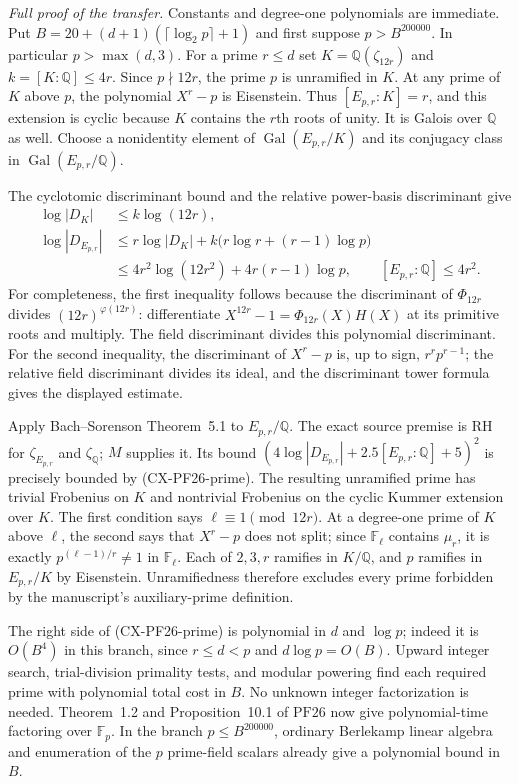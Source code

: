 \emph{Full proof of the transfer.}
Constants and degree-one polynomials are immediate. Put
$B=20+(d+1)(\lceil\log_2p\rceil+1)$ and first suppose
$p>B^{200000}$. In particular $p>\max(d,3)$.
For a prime $r\le d$ set $K=\mathbb Q(\zeta_{12r})$ and
$k=[K:\mathbb Q]\le4r$. Since $p\nmid12r$, the prime $p$ is
unramified in $K$. At any prime of $K$ above $p$, the polynomial
$X^r-p$ is Eisenstein. Thus $[E_{p,r}:K]=r$, and this extension is
cyclic because $K$ contains the $r$th roots of unity. It is Galois
over $\mathbb Q$ as well. Choose a nonidentity element of
$\operatorname{Gal}(E_{p,r}/K)$ and its conjugacy class in
$\operatorname{Gal}(E_{p,r}/\mathbb Q)$.

The cyclotomic discriminant bound and the relative power-basis
discriminant give
\begin{align*}
 \log|D_K|&\le k\log(12r),\\
 \log|D_{E_{p,r}}|
 &\le r\log|D_K|+
        k\bigl(r\log r+(r-1)\log p\bigr)\\
 &\le4r^2\log(12r^2)+4r(r-1)\log p,\qquad
 [E_{p,r}:\mathbb Q]\le4r^2.
\end{align*}
For completeness, the first inequality follows because the
discriminant of $\Phi_{12r}$ divides $(12r)^{\varphi(12r)}$:
differentiate $X^{12r}-1=\Phi_{12r}(X)H(X)$ at its primitive
roots and multiply. The field discriminant divides this polynomial
discriminant. For the second inequality, the discriminant of
$X^r-p$ is, up to sign, $r^rp^{r-1}$; the relative field
discriminant divides its ideal, and the discriminant tower formula
gives the displayed estimate.

Apply Bach--Sorenson Theorem~5.1 to $E_{p,r}/\mathbb Q$.
The exact source premise is RH for $\zeta_{E_{p,r}}$ and
$\zeta_{\mathbb Q}$; $M$ supplies it. Its bound
$(4\log|D_{E_{p,r}}|+2.5[E_{p,r}:\mathbb Q]+5)^2$
is precisely bounded by (CX-PF26-prime). The resulting unramified
prime has trivial Frobenius on $K$ and nontrivial Frobenius on the
cyclic Kummer extension over $K$. The first condition says
$\ell\equiv1\pmod{12r}$. At a degree-one prime of $K$ above
$\ell$, the second says that $X^r-p$ does not split; since
$\mathbb F_\ell$ contains $\mu_r$, it is exactly
$p^{(\ell-1)/r}\ne1$ in $\mathbb F_\ell$.
Each of $2,3,r$ ramifies in $K/\mathbb Q$, and $p$ ramifies
in $E_{p,r}/K$ by Eisenstein. Unramifiedness therefore excludes
every prime forbidden by the manuscript's auxiliary-prime definition.

The right side of (CX-PF26-prime) is polynomial in $d$ and
$\log p$; indeed it is $O(B^4)$ in this branch, since
$r\le d<p$ and $d\log p=O(B)$. Upward integer search,
trial-division primality tests, and modular powering find each
required prime with polynomial total cost in $B$. No unknown
integer factorization is needed. Theorem~1.2 and Proposition~10.1
of $\mathrm{PF26}$ now give polynomial-time factoring over
$\mathbb F_p$. In the branch $p\le B^{200000}$, ordinary
Berlekamp linear algebra and enumeration of the $p$ prime-field
scalars already give a polynomial bound in $B$.

